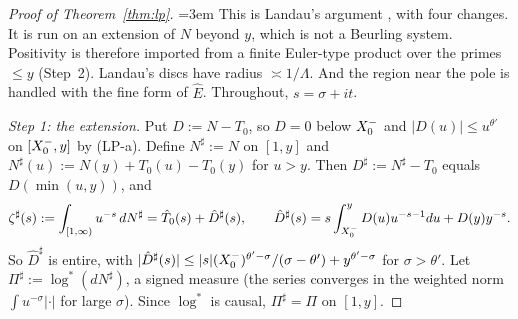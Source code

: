 \begin{proof}[Proof of Theorem~\ref{thm:lp}]
\begingroup\emergencystretch=3em
This is Landau's argument \cite[Lemmas~6.2--6.3 and the proof of Thm.~6.6]{MontgomeryVaughan2007}, with four changes. It is
run on an extension of $N$ beyond $y$, which is not a Beurling system. Positivity is therefore imported from a finite
Euler-type product over the primes $\le y$ (Step~2). Landau's discs have radius $\asymp1/\Lambda$. And the region near the pole is handled with the fine form of
$\hat E$. Throughout, $s=\sigma+it$.\par\endgroup

\emph{Step 1: the extension.} Put $D:=N-T_0$, so $D=0$ below $X_0^{-}$ and $|D(u)|\le u^{\theta'}$ on $[X_0^{-},y]$ by (LP-a). Define
$N^\sharp:=N$ on $[1,y]$ and $N^\sharp(u):=N(y)+T_0(u)-T_0(y)$ for $u>y$. Then $D^\sharp:=N^\sharp-T_0$ equals
$D(\min(u,y))$, and
\[
  \zeta^\sharp(s):=\int_{[1,\infty)}u^{-s}\,dN^\sharp=\hat T_0(s)+\hat D^\sharp(s),\qquad
  \hat D^\sharp(s)=s\int_{X_0^{-}}^yD(u)u^{-s-1}du+D(y)y^{-s}.
\]
So $\hat D^\sharp$ is entire, with $|\hat D^\sharp(s)|\le|s|(X_0^{-})^{\theta'-\sigma}/(\sigma-\theta')+y^{\theta'-\sigma}$ for
$\sigma>\theta'$. Let $\Pi^\sharp:=\log^*(dN^\sharp)$, a signed measure (the series converges in the weighted norm
$\int u^{-\sigma}|\cdot|$ for large $\sigma$). Since $\log^*$ is causal, $\Pi^\sharp=\Pi$ on $[1,y]$.


\end{proof}
